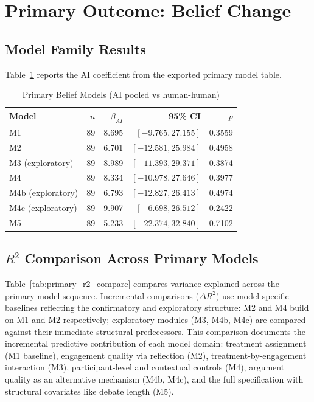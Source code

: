 \pagebreak
\section{Primary Outcome: Belief Change}

\subsection{Model Family Results}
\label{sec:model_family_results}

Table~\ref{tab:primary_models} reports the AI coefficient from the exported primary model table.

\begin{table}[h]
\centering
\caption{Primary Belief Models (AI pooled vs human-human)}
\label{tab:primary_models}
\begin{tabular}{lrrrr}
\toprule
Model & $n$ & $\beta_{AI}$ & 95\% CI & $p$ \\
\midrule
M1 & 89 & 8.695 & $[-9.765, 27.155]$ & 0.3559 \\
M2 & 89 & 6.701 & $[-12.581, 25.984]$ & 0.4958 \\
M3 (exploratory) & 89 & 8.989 & $[-11.393, 29.371]$ & 0.3874 \\
M4 & 89 & 8.334 & $[-10.978, 27.646]$ & 0.3977 \\
M4b (exploratory) & 89 & 6.793 & $[-12.827, 26.413]$ & 0.4974 \\
M4c (exploratory) & 89 & 9.907 & $[-6.698, 26.512]$ & 0.2422 \\
M5 & 89 & 5.233 & $[-22.374, 32.840]$ & 0.7102 \\
\bottomrule
\end{tabular}
\end{table}

\subsection{$R^2$ Comparison Across Primary Models}

Table~\ref{tab:primary_r2_compare} compares variance explained across the primary
model sequence. Incremental comparisons ($\Delta R^2$) use model-specific baselines
reflecting the confirmatory and exploratory structure: M2 and M4 build on M1 and M2
respectively; exploratory modules (M3, M4b, M4c) are compared against their immediate
structural predecessors.
This comparison documents the incremental predictive contribution of each model domain:
treatment assignment (M1 baseline), engagement quality via reflection (M2), treatment-by-engagement interaction (M3),
participant-level and contextual controls (M4), argument quality as an alternative mechanism
(M4b, M4c), and the full specification with structural covariates like debate length (M5).

